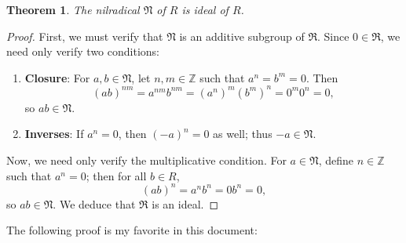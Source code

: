\documentclass[11pt]{article}
\newtheorem{theorem}{Theorem}
\begin{document}
\begin{adjustwidth}{0.5cm}{}
	\begin{theorem}
		The nilradical $\mathfrak{N}$ of $R$ is ideal of $R$.
	\end{theorem}
	\begin{proof}
		First, we must verify that $\mathfrak{N}$ is an additive subgroup of $\mathfrak{R}$. Since $0 \in \mathfrak{R}$, we need only verify two conditions:
		\begin{enumerate}
			\item \textbf{Closure}: For $a, b \in \mathfrak{N}$, let $n, m \in \mathbb{Z}$ such that $a^{n} = b^{m} = 0$. Then
			\[
				(ab)^{nm} = a^{nm} b^{nm} = (a^{n})^{m}(b^{m})^{n} = 0^{m}0^{n} = 0,
			\]
			so $ab \in \mathfrak{N}$.
			\item \textbf{Inverses}: If $a^{n} = 0$, then $(-a)^{n} = 0$ as well; thus $-a \in \mathfrak{N}$.
		\end{enumerate}
		Now, we need only verify the multiplicative condition. For $a \in \mathfrak{N}$, define $n \in \mathbb{Z}$ such that $a^{n} = 0$; then for all $b \in R$,
		\[
			(ab)^{n} = a^{n}b^{n} = 0b^{n} = 0,
		\]
		so $ab \in \mathfrak{N}$. We deduce that $\mathfrak{R}$ is an ideal.
	\end{proof}
\end{adjustwidth}

The following proof is my favorite in this document:
\end{document}
